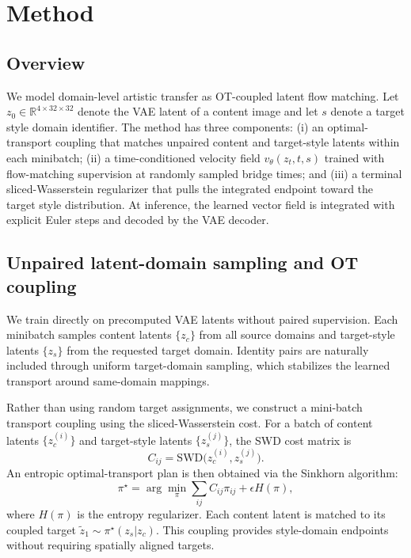 ﻿\documentclass[letterpaper]{article}
\begin{document}
\section{Method}
\subsection{Overview}
We model domain-level artistic transfer as OT-coupled latent flow matching. Let $z_0 \in \mathbb{R}^{4 \times 32 \times 32}$ denote the VAE latent of a content image and let $s$ denote a target style domain identifier. The method has three components: (i) an optimal-transport coupling that matches unpaired content and target-style latents within each minibatch; (ii) a time-conditioned velocity field $v_\theta(z_t,t,s)$ trained with flow-matching supervision at randomly sampled bridge times; and (iii) a terminal sliced-Wasserstein regularizer that pulls the integrated endpoint toward the target style distribution. At inference, the learned vector field is integrated with explicit Euler steps and decoded by the VAE decoder.

\subsection{Unpaired latent-domain sampling and OT coupling}
We train directly on precomputed VAE latents without paired supervision. Each minibatch samples content latents $\{z_c\}$ from all source domains and target-style latents $\{z_s\}$ from the requested target domain. Identity pairs are naturally included through uniform target-domain sampling, which stabilizes the learned transport around same-domain mappings.

Rather than using random target assignments, we construct a mini-batch transport coupling using the sliced-Wasserstein cost. For a batch of content latents $\{z_c^{(i)}\}$ and target-style latents $\{z_s^{(j)}\}$, the SWD cost matrix is
\begin{equation}
    C_{ij} = \mathrm{SWD}\bigl(z_c^{(i)}, z_s^{(j)}\bigr) .
\end{equation}
An entropic optimal-transport plan is then obtained via the Sinkhorn algorithm:
\begin{equation}
    \pi^\star = \arg\min_\pi \sum_{ij} C_{ij}\pi_{ij} + \epsilon H(\pi),
\end{equation}
where $H(\pi)$ is the entropy regularizer. Each content latent is matched to its coupled target $\tilde{z}_1 \sim \pi^\star(z_s|z_c)$. This coupling provides style-domain endpoints without requiring spatially aligned targets.
\end{document}
